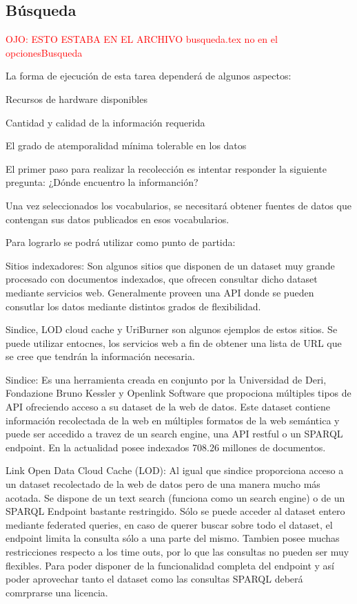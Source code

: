 
\subsection{Búsqueda}
%
\textcolor{red}{OJO: ESTO ESTABA EN EL ARCHIVO busqueda.tex no en el opcionesBusqueda}


La forma de ejecución de esta tarea dependerá de algunos aspectos:

Recursos de hardware disponibles

Cantidad y calidad de la información requerida

El grado de atemporalidad mínima tolerable en los datos

El primer paso para realizar la recolección es intentar responder la siguiente pregunta: ¿Dónde encuentro la informanción?

Una vez seleccionados los vocabularios, se necesitará obtener fuentes de datos que contengan sus datos publicados en esos vocabularios.
 
Para lograrlo se podrá utilizar como punto de partida:

Sitios indexadores: Son algunos sitios que disponen de un dataset muy grande procesado con documentos indexados, que ofrecen consultar dicho 
dataset mediante servicios web. Generalmente proveen una API donde se pueden consutlar los datos mediante distintos grados de flexibilidad.

Sindice, LOD cloud cache y UriBurner son algunos ejemplos de estos sitios. Se puede utilizar entocnes, los servicios web a fin
de obtener una lista de URL que se cree que tendrán la información necesaria.

Sindice: Es una herramienta creada en conjunto por la Universidad de Deri,  Fondazione Bruno Kessler y Openlink Software que propociona múltiples tipos de API ofreciendo acceso a su dataset de la web de datos. Este dataset contiene información recolectada de la web en múltiples formatos de la web semántica y puede ser accedido a travez de un search engine, una API restful o un SPARQL endpoint.  
En la actualidad posee indexados 708.26 millones de documentos.

Link Open Data Cloud Cache (LOD): Al igual que sindice proporciona acceso a un dataset recolectado de la web de datos pero de una manera mucho más acotada. Se dispone de un text search (funciona como un search engine) o de un SPARQL Endpoint bastante restringido. Sólo se puede acceder al dataset entero mediante federated queries, en caso de querer buscar sobre todo el dataset, el endpoint limita la consulta sólo a una parte del mismo. Tambien posee muchas restricciones respecto a los time outs, por lo que las consultas no pueden ser muy flexibles.
Para poder disponer de la funcionalidad completa del endpoint y así poder aprovechar tanto el dataset como las consultas SPARQL deberá comrprarse una licencia.

